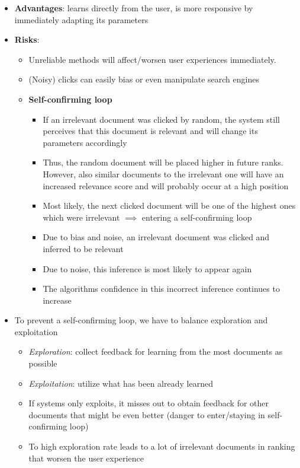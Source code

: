 \begin{itemize}
\begin{itemize}
	\end{itemize}
	\item \textbf{Advantages}: learns directly from the user, is more responsive by immediately adapting its parameters
	\item \textbf{Risks}:
	\begin{itemize}
		\item Unreliable methods will affect/worsen user experiences immediately.
		\item (Noisy) clicks can easily bias or even manipulate search engines
		\item \textbf{Self-confirming loop}
		\begin{itemize}
			\item If an irrelevant document was clicked by random, the system still perceives that this document is relevant and will change its parameters accordingly
			\item Thus, the random document will be placed higher in future ranks. However, also similar documents to the irrelevant one will have an increased relevance score and will probably occur at a high position
			\item Most likely, the next clicked document will be one of the highest ones which were irrelevant $\implies$ entering a self-confirming loop
			\item Due to bias and noise, an irrelevant document was clicked and inferred to be relevant
			\item Due to noise, this inference is most likely to appear again
			\item The algorithms confidence in this incorrect inference continues to increase
		\end{itemize}
	\end{itemize}
	\item To prevent a self-confirming loop, we have to balance exploration and exploitation
	\begin{itemize}
		\item \textit{Exploration}: collect feedback for learning from the most documents as possible
		\item \textit{Exploitation}: utilize what has been already learned 
		\item If systems only exploits, it misses out to obtain feedback for other documents that might be even better (danger to enter/staying in self-confirming loop)
		\item To high exploration rate leads to a lot of irrelevant documents in ranking that worsen the user experience 
	\end{itemize}
\end{itemize}
